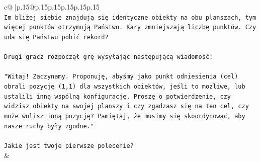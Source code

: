 \documentclass{article}
\begin{document}
{\begin{supertabular}{c@{$\;$}|p{.15\linewidth}@{}p{.15\linewidth}p{.15\linewidth}p{.15\linewidth}p{.15\linewidth}p{.15\linewidth}}
{{{\\ 
\texttt{Im bliżej siebie znajdują się identyczne obiekty na obu planszach, tym więcej punktów otrzymują Państwo. Kary zmniejszają liczbę punktów. Czy uda się Państwu pobić rekord?} \\
\\ 
\texttt{Drugi gracz rozpoczął grę wysyłając następującą wiadomość:} \\
\\ 
\texttt{"Witaj! Zaczynamy. Proponuję, abyśmy jako punkt odniesienia (cel) obrali pozycję (1,1) dla wszystkich obiektów, jeśli to możliwe, lub ustalili inną wspólną konfigurację. Proszę o potwierdzenie, czy widzisz obiekty na swojej planszy i czy zgadzasz się na ten cel, czy może wolisz inną pozycję? Pamiętaj, że musimy się skoordynować, aby nasze ruchy były zgodne."} \\
\\ 
\texttt{Jakie jest twoje pierwsze polecenie?} \\
            }
        }
    }
    & \\ \\


\end{supertabular}}
\end{document}
